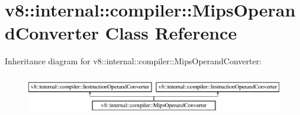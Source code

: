 \hypertarget{classv8_1_1internal_1_1compiler_1_1_mips_operand_converter}{}\section{v8\+:\+:internal\+:\+:compiler\+:\+:Mips\+Operand\+Converter Class Reference}
\label{classv8_1_1internal_1_1compiler_1_1_mips_operand_converter}
Inheritance diagram for v8\+:\+:internal\+:\+:compiler\+:\+:Mips\+Operand\+Converter\+:\begin{figure}[H]
\begin{center}
\leavevmode
\includegraphics[height=1.824104cm]{classv8_1_1internal_1_1compiler_1_1_mips_operand_converter}
\end{center}
\end{figure}
